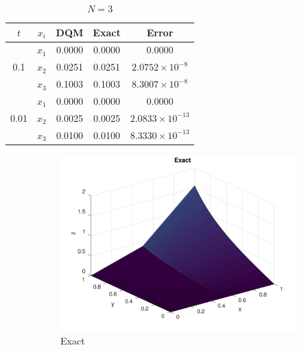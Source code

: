 \begin{solution}
\begin{english}	
\begin{table}[ht]
	\centering
	\begin{tabular}{|c|c|c|c|c|}
		\hline
		$t$ & $x_i$ & DQM & Exact & Error \\
		\hline
		\multirow{3}{*}{0.1} & $x_1$ & 0.0000 & 0.0000 & 0.0000 \\
		& $x_2$ & 0.0251 & 0.0251 & $2.0752 \times 10^{-8}$ \\
		& $x_3$ & 0.1003 & 0.1003 & $8.3007 \times 10^{-8}$ \\
		\hline
		\multirow{3}{*}{0.01} & $x_1$ & 0.0000 & 0.0000 & 0.0000 \\
		& $x_2$ & 0.0025 & 0.0025 & $2.0833 \times 10^{-13}$ \\
		& $x_3$ & 0.0100 & 0.0100 & $8.3330 \times 10^{-13}$ \\
		\hline
	\end{tabular}
\caption{$N=3$}
\label{tab:firstexN3}
\end{table}
\end{english}
\begin{english}
	\begin{figure}[ht]
		\centering
		\begin{subfigure}{0.3\textwidth}
			\includegraphics[scale=0.05]{Figures/firstExactN3}
			\caption{Exact}
		\end{subfigure}
		\qquad \begin{subfigure}{0.3\textwidth}

\end{subfigure}
\end{figure}
\end{english}
\end{solution}
